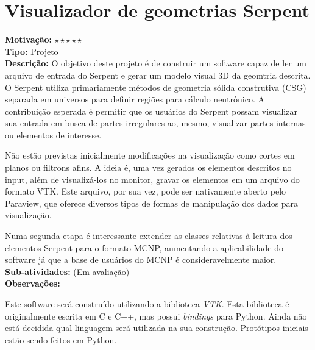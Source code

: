 \chapter{Visualizador de geometrias Serpent}

\textbf{Motivação:} $\star\star\star\star\star$\\

\textbf{Tipo:} Projeto\\

\textbf{Descrição:} O objetivo deste projeto é de construir um software capaz 
de ler um arquivo de entrada do Serpent e gerar um modelo visual 3D da geomtria 
descrita. O Serpent utiliza primariamente métodos de geometria sólida construtiva 
(CSG) separada em universos para definir regiões para cálculo neutrônico. A 
contribuição esperada é permitir que os usuários do Serpent possam visualizar 
sua entrada em busca de partes irregulares ao, mesmo, visualizar partes internas 
ou elementos de interesse.

Não estão previstas inicialmente modificações na visualização como cortes em 
planos ou filtrons afins. A ideia é, uma vez gerados os elementos descritos no 
input, além de visualizá-los no monitor, gravar os elementos em um arquivo 
do formato VTK. Este arquivo, por sua vez, pode ser nativamente aberto pelo 
Paraview, que oferece diversos tipos de formas de manipulação dos dados para 
visualização.

Numa segunda etapa é interessante extender as classes relativas à leitura dos elementos Serpent para o formato MCNP, aumentando a aplicabilidade do software 
já que a base de usuários do MCNP é consideravelmente maior.\\

\textbf{Sub-atividades:} (Em avaliação) \\


\textbf{Observações:}

Este software será construído utilizando a biblioteca \textit{VTK}. Esta biblioteca 
é originalmente escrita em C e C++, mas possui \textit{bindings} para Python. Ainda não está decidida qual linguagem será utilizada na sua construção. Protótipos 
iniciais estão sendo feitos em Python.\\


